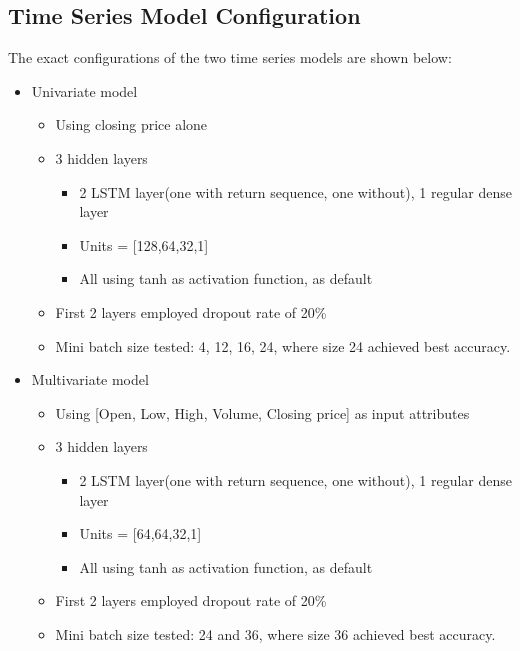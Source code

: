 \documentclass{article}
\begin{document}
\subsection{Time Series Model Configuration}
The exact configurations of the two time series models are shown below:
	\begin{itemize}
		\item Univariate model
			\begin{itemize}
				\item Using closing price alone
				\item 3 hidden layers
					\begin{itemize}
						\item  2 LSTM layer(one with return sequence, one without), 1 regular dense layer
						\item Units = [128,64,32,1]
						\item All using tanh as activation function, as default
					\end{itemize}
				\item First 2 layers employed dropout rate of 20\%
				\item Mini batch size tested: 4, 12, 16, 24, where size 24 achieved best accuracy.
			\end{itemize}
		\item Multivariate model
			\begin{itemize}
				\item Using [Open, Low, High, Volume, Closing price] as input attributes
				\item 3 hidden layers
					\begin{itemize}
						\item  2 LSTM layer(one with return sequence, one without), 1 regular dense layer
						\item Units = [64,64,32,1]
						\item All using tanh as activation function, as default
					\end{itemize}
				\item First 2 layers employed dropout rate of 20\%
				\item Mini batch size tested: 24 and 36, where size 36 achieved best accuracy.
			\end{itemize}
	\end{itemize}

\end{document}
